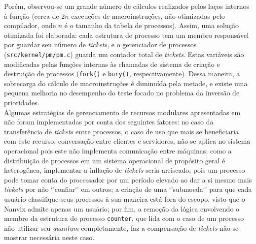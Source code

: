 \documentclass[12pt]{article}
\begin{document}
Porém, observou-se um grande número de cálculos realizados pelos laços internos
à função (cerca de $2n$ execuções de macroinstruções, não otimizadas pelo
compilador, onde $n$ é o tamanho da tabela de processos). Assim, uma solução
otimizada foi elaborada: cada estrutura de processo tem um membro responsável
por guardar seu número de \emph{tickets}, e o gerenciador de processos
(\texttt{src/kernel/pm/pm.c}) guarda um contador total de \emph{tickets}. Estas
variáveis são modificadas pelas funções internas às chamadas de sistema de
criação e destruição de processos (\texttt{fork()} e \texttt{bury()},
respectivamente). Dessa maneira, a sobrecarga do cálculo de macroinstruções é
diminuída pela metade, e existe uma pequena melhoria no desempenho do teste
focado no problema da inversão de prioridades. \\

Algumas estratégias de gerenciamento de recursos modulares apresentadas em
\cite[cap. 3]{Waldspurger:1994:LSF:1267638.1267639} não foram implementadas por
conta dos seguintes fatores: no caso da transferência de \emph{tickets} entre
processos, o caso de uso que mais se beneficiaria com este recurso, conversação
entre clientes e servidores, não se aplica no sistema operacional pois este não
implementa comunicação entre máquinas; como a distribuição de processos em um
sistema operacional de propósito geral é heterogênea, implementar a inflação de
\emph{tickets} seria arriscado, pois um processo pode tomar conta do
processador por um período elevado ao dar a si mesmo mais \emph{tickets} por
não `'confiar`' em outros; a criação de uma `'submoeda`' para que cada usuário
classifique seus processos à sua maneira está fora do escopo, visto que o
Nanvix admite apenas um usuário; por fim, a remoção da lógica envolvendo o
membro da estrutura de processo \texttt{counter}, que lida com o caso de um
processo não utilizar seu \emph{quantum} completamente, faz a compensação de
\emph{tickets} não se mostrar necessária neste caso.



\end{document}
